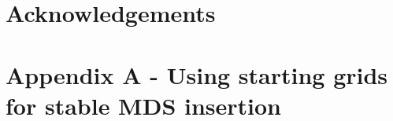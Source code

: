 \documentclass[useAMS,referee, usegraphicx]{biom}
\begin{document}
%




\section*{Acknowledgements}



\section*{Appendix A - Using starting grids for stable MDS insertion}
\end{document}
